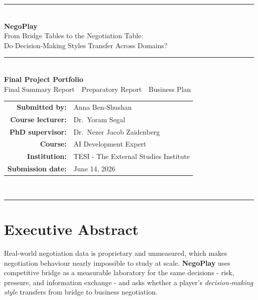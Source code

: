 \documentclass[11pt, a4paper, oneside, openany]{report}
\begin{document}
\begin{titlepage}
\centering
\vspace*{1.8cm}
{\color{navy}\rule{\textwidth}{1.2pt}}\\[1.2cm]
{\Huge\bfseries\color{navy} NegoPlay\\[0.45cm]}
{\Large From Bridge Tables to the Negotiation Table:\\
Do Decision-Making Styles Transfer Across Domains?\\[1.0cm]}
{\color{navy}\rule{0.6\textwidth}{0.6pt}}\\[1.4cm]
{\large \textbf{Final Project Portfolio}\\
Final Summary Report \,\textperiodcentered\, Preparatory Report \,\textperiodcentered\, Business Plan\\[1.8cm]}
\begin{tabular}{rl}
\textbf{Submitted by:} & Anna Ben-Shushan \\[6pt]
\textbf{Course lecturer:} & Dr.\ Yoram Segal \\[6pt]
\textbf{PhD supervisor:} & Dr.\ Nezer Jacob Zaidenberg \\[6pt]
\textbf{Course:} & AI Development Expert \\[6pt]
\textbf{Institution:} & TESI - The External Studies Institute \\[6pt]
\textbf{Submission date:} & June 14, 2026 \\
\end{tabular}\\[2.0cm]
{\color{navy}\rule{\textwidth}{1.2pt}}
\vfill
\end{titlepage}

\chapter*{Executive Abstract}

Real-world negotiation data is proprietary and unmeasured, which makes
negotiation behaviour nearly impossible to study at scale. \textbf{NegoPlay}
uses competitive bridge as a measurable laboratory for the same decisions - 
risk, pressure, and information exchange - and asks whether a player's
\emph{decision-making style} transfers from bridge to business negotiation.
\end{document}
